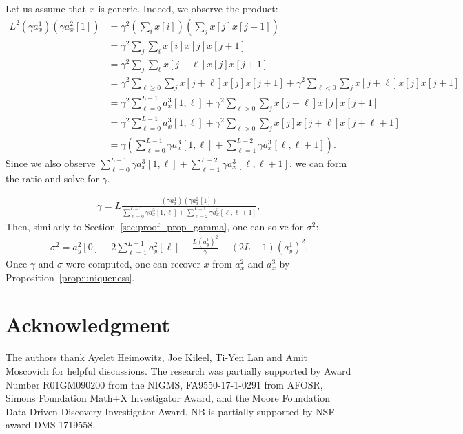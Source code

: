 \documentclass[12pt]{article}
\newcommand{\1}{\mathbf{1}}
\newcommand{\TODO}[1]{{\color{red}{[#1]}}}
\theoremstyle{plain}
\theoremstyle{definition}
\theoremstyle{remark}
\theoremstyle{plain}
\theoremstyle{remark}
\theoremstyle{plain}
\theoremstyle{plain}
\theoremstyle{plain}
\numberwithin{equation}{section}
\begin{document}
	Let us assume that $x$ is generic. Indeed, we observe the product:
	\begin{align}
	L^2(\gamma a_x^1) (\gamma a_x^2[1])
	&= \gamma^2\left( \sum_{i} x[i] \right) \left(\sum_{j} x[j]x[j+1] \right)
	\nonumber \\
	&= \gamma^2\sum_{j} \sum_{i} x[i]x[j]x[j+1]
	\nonumber \\
	&=  \gamma^2\sum_{j} \sum_{\ell} x[j+\ell]x[j]x[j+1]
	\nonumber \\
	&=  \gamma^2\sum_{\ell \ge 0} \sum_{j} x[j+\ell]x[j]x[j+1] 
	+ \gamma^2\sum_{\ell < 0} \sum_{j} x[j+\ell]x[j]x[j+1]
	\nonumber \\
	&=  \gamma^2\sum_{\ell=0}^{L-1} a_x^3[1,\ell] 
	+ \gamma^2\sum_{\ell > 0} \sum_{j} x[j-\ell]x[j]x[j+1]
	\nonumber \\
	&=  \gamma^2\sum_{\ell=0}^{L-1} a_x^3[1,\ell] 
	+ \gamma^2\sum_{\ell > 0} \sum_{j} x[j]x[j+\ell]x[j+\ell+1]
	\nonumber \\
	&= \gamma\left( \sum_{\ell=0}^{L-1} \gamma a_x^3[1,\ell]
	+ \sum_{\ell=1}^{L-2} \gamma a_x^3[\ell,\ell+1]  \right).
	\end{align}
	Since we also observe $\sum_{\ell=0}^{L-1} \gamma a_x^3[1,\ell] + \sum_{\ell=1}^{L-2} \gamma a_x^3[\ell,\ell+1]$, we can form the ratio and solve for $\gamma$.
	
	\begin{align}
	\gamma = L \frac{(\gamma a_x^1) (\gamma a_x^2[1])}
	{\sum_{\ell=0}^{L-1} \gamma a_x^3[1,\ell] 
		+ \sum_{\ell=2}^{L-1} \gamma a_x^3[\ell,\ell+1]},
	\end{align}
	Then, similarly to Section~\ref{sec:proof_prop_gamma}, one can solve for $\sigma^2$:
	\begin{align}
	\sigma^2 = a_y^2[0] + 2\sum_{\ell = 1}^{L-1}a_y^2[\ell]-\frac{L (a^1_y)^2}{\gamma}
	- (2 L - 1) (a_y^1)^2.
	\end{align}
Once $\gamma$ and $\sigma$ were computed, one can recover $x$ from $a_x^2$ and $a_x^3$  by Proposition~\ref{prop:uniqueness}.

\section*{Acknowledgment} \TODO{To check}
The authors  thank Ayelet Heimowitz, Joe Kileel, Ti-Yen Lan and Amit Moscovich  for helpful discussions.
The research was partially supported by Award Number R01GM090200 from the NIGMS, FA9550-17-1-0291 from AFOSR, Simons Foundation Math+X Investigator Award, and the Moore Foundation Data-Driven Discovery Investigator Award.
NB is partially supported by NSF award DMS-1719558.



\end{document}
